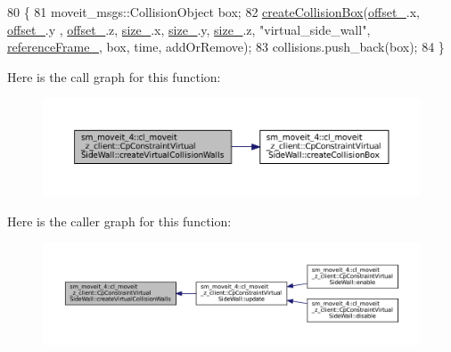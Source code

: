 \begin{DoxyCode}
80         \{
81             moveit\_msgs::CollisionObject box;
82             \hyperlink{classsm__moveit__4_1_1cl__moveit__z__client_1_1CpConstraintVirtualSideWall_a9f08de3e14d64a3b23e32c255cf67b4d}{createCollisionBox}(\hyperlink{classsm__moveit__4_1_1cl__moveit__z__client_1_1CpConstraintVirtualSideWall_acefab4905c8cb5f72122c84310cfeb7c}{offset\_}.x, \hyperlink{classsm__moveit__4_1_1cl__moveit__z__client_1_1CpConstraintVirtualSideWall_acefab4905c8cb5f72122c84310cfeb7c}{offset\_}.y , 
      \hyperlink{classsm__moveit__4_1_1cl__moveit__z__client_1_1CpConstraintVirtualSideWall_acefab4905c8cb5f72122c84310cfeb7c}{offset\_}.z, \hyperlink{classsm__moveit__4_1_1cl__moveit__z__client_1_1CpConstraintVirtualSideWall_ae249e70499ae591a06d24b9b9877d3c6}{size\_}.x, \hyperlink{classsm__moveit__4_1_1cl__moveit__z__client_1_1CpConstraintVirtualSideWall_ae249e70499ae591a06d24b9b9877d3c6}{size\_}.y, \hyperlink{classsm__moveit__4_1_1cl__moveit__z__client_1_1CpConstraintVirtualSideWall_ae249e70499ae591a06d24b9b9877d3c6}{size\_}.z, \textcolor{stringliteral}{"virtual\_side\_wall"}, 
      \hyperlink{classsm__moveit__4_1_1cl__moveit__z__client_1_1CpConstraintVirtualSideWall_a0b43e5e3942efb3498a919accffbc3cc}{referenceFrame\_}, box, time, addOrRemove);
83             collisions.push\_back(box);
84         \}
\end{DoxyCode}
Here is the call graph for this function\+:
\nopagebreak
\begin{figure}[H]
\begin{center}
\leavevmode
\includegraphics[width=350pt]{classsm__moveit__4_1_1cl__moveit__z__client_1_1CpConstraintVirtualSideWall_a98bd6187825c00d9d6fca3ab4e1a1c5d_cgraph}
\end{center}
\end{figure}
Here is the caller graph for this function\+:
\nopagebreak
\begin{figure}[H]
\begin{center}
\leavevmode
\includegraphics[width=350pt]{classsm__moveit__4_1_1cl__moveit__z__client_1_1CpConstraintVirtualSideWall_a98bd6187825c00d9d6fca3ab4e1a1c5d_icgraph}
\end{center}
\end{figure}
